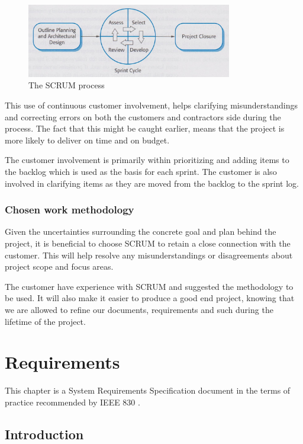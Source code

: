\documentclass[11pt]{book}
\begin{document}
\begin{figure}[H]
      \centering
      \includegraphics[width=0.8\textwidth]{Figures/Prestudy/SCRUM.jpeg}
      \caption{The SCRUM process}
      \label{fig:pre_scrum}
\end{figure}

This use of continuous customer involvement, helps clarifying misunderstandings and correcting errors on both the customers and contractors side during the process. The fact that this might be caught earlier, means that the project is more likely to deliver on time and on budget.

The customer involvement is primarily within prioritizing and adding items to the backlog which is used as the basis for each sprint. The customer is also involved in clarifying items as they are moved from the backlog to the sprint log.


\subsection{Chosen work methodology}
Given the uncertainties surrounding the concrete goal and plan behind the project, it is beneficial to choose SCRUM to retain a close connection with the customer. This will help resolve any misunderstandings or disagreements about project scope and focus areas.

The customer have experience with SCRUM and suggested the methodology to be used. It will also make it easier to produce a good end project, knowing that we are allowed to refine our documents, requirements and such during the lifetime of the project.

\chapter{Requirements} \label{chap:req}

This chapter is a System Requirements Specification document in the terms of practice recommended by IEEE 830 \cite{ieee830}.

\section{Introduction}
\end{document}
